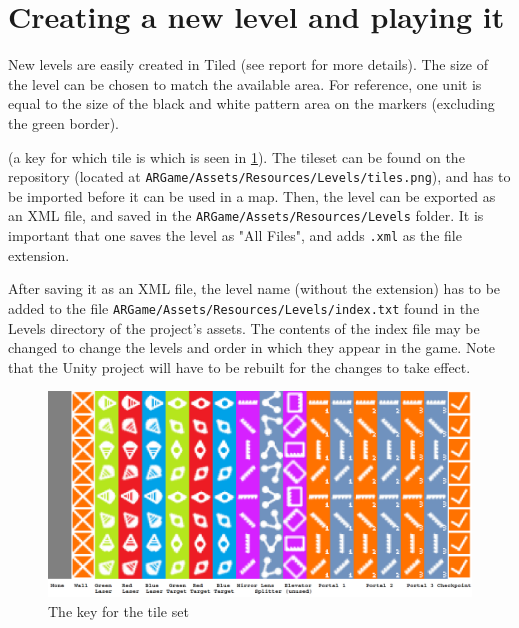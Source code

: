 \documentclass{report}
\begin{document}
\section*{Creating a new level and playing it}
	New levels are easily created in Tiled (see report for more details). The size 
	of the level can be chosen to match the available area. For reference, one unit
	is equal to the size of the black and white pattern area on the markers (excluding 
	the green border).  
	
	(a key for which tile is which is seen in \ref{fig:tilekey}). The tileset can be
	found on the repository (located at \verb#ARGame/Assets/Resources/Levels/tiles.png#), 
	and has to be imported before it can be used in a map. Then, the 
	level can be exported as an XML file, and saved in the \verb#ARGame/Assets/Resources/Levels# folder.
	It is important that one saves the level as "All Files", and adds \texttt{.xml} as the file extension.
	
	After saving it as an XML file, the level name (without the extension)
	has to be added to the file \texttt{ARGame/Assets/Resources/Levels/index.txt} found in the Levels directory of 
	the project's assets. The contents of the index file may be changed to 
	change the levels and order in which they appear in the game. Note that the Unity
	project will have to be rebuilt for the changes to take effect.
	
	\begin{figure}[!ht]
		\centering
		\includegraphics[scale = 0.3]{TileKey}
		\caption{The key for the tile set}
		\label{fig:tilekey}
	\end{figure}
\end{document}

